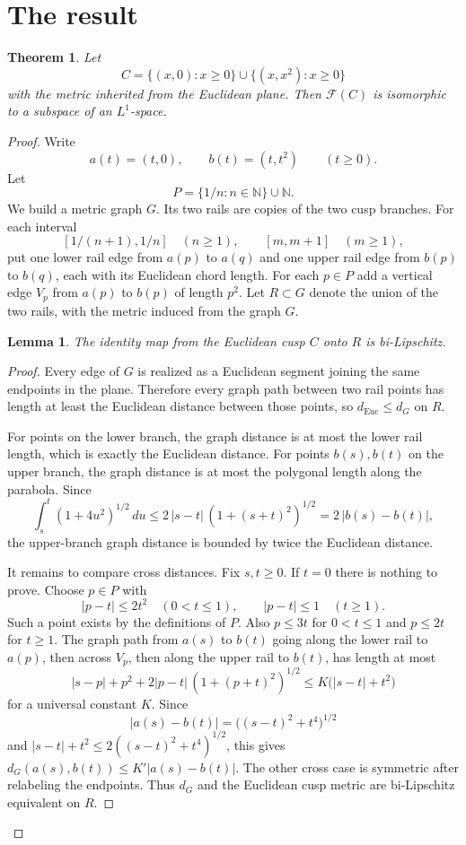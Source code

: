 \documentclass[11pt]{article}
\newtheorem{theorem}{Theorem}
\newtheorem{lemma}{Lemma}
\newcommand{\F}{\mathcal F}
\newcommand{\N}{\mathbb N}
\begin{document}
\section{The result}

\begin{theorem}
Let
\[
 C=\{(x,0):x\geq 0\}\cup \{(x,x^2):x\geq 0\}
\]
with the metric inherited from the Euclidean plane.  Then \(\F(C)\) is isomorphic to a subspace of an \(L^1\)-space.
\end{theorem}

\begin{proof}
Write
\[
 a(t)=(t,0),\qquad b(t)=(t,t^2)\qquad (t\geq 0).
\]
Let
\[
 P=\{1/n:n\in\N\}\cup \N .
\]
We build a metric graph \(G\).  Its two rails are copies of the two cusp branches.  For each interval
\[
 [1/(n+1),1/n]\quad(n\geq 1),\qquad [m,m+1]\quad(m\geq 1),
\]
put one lower rail edge from \(a(p)\) to \(a(q)\) and one upper rail edge from \(b(p)\) to \(b(q)\), each with its Euclidean chord length.  For each \(p\in P\) add a vertical edge \(V_p\) from \(a(p)\) to \(b(p)\) of length \(p^2\).  Let \(R\subset G\) denote the union of the two rails, with the metric induced from the graph \(G\).

\begin{lemma}
The identity map from the Euclidean cusp \(C\) onto \(R\) is bi-Lipschitz.
\end{lemma}

\begin{proof}
Every edge of \(G\) is realized as a Euclidean segment joining the same endpoints in the plane.  Therefore every graph path between two rail points has length at least the Euclidean distance between those points, so \(d_{\mathrm{Euc}}\leq d_G\) on \(R\).

For points on the lower branch, the graph distance is at most the lower rail length, which is exactly the Euclidean distance.  For points \(b(s),b(t)\) on the upper branch, the graph distance is at most the polygonal length along the parabola.  Since
\[
 \int_s^t (1+4u^2)^{1/2}\,du
 \leq 2\, |s-t|\,(1+(s+t)^2)^{1/2}
 =2\,|b(s)-b(t)|,
\]
the upper-branch graph distance is bounded by twice the Euclidean distance.

It remains to compare cross distances.  Fix \(s,t\geq 0\).  If \(t=0\) there is nothing to prove.  Choose \(p\in P\) with
\[
 |p-t|\leq 2t^2\quad (0<t\leq 1),\qquad |p-t|\leq 1\quad(t\geq 1).
\]
Such a point exists by the definitions of \(P\).  Also \(p\leq 3t\) for \(0<t\leq 1\) and \(p\leq 2t\) for \(t\geq 1\).  The graph path from \(a(s)\) to \(b(t)\) going along the lower rail to \(a(p)\), then across \(V_p\), then along the upper rail to \(b(t)\), has length at most
\[
 |s-p|+p^2+2|p-t|\,(1+(p+t)^2)^{1/2}
 \leq K\bigl(|s-t|+t^2\bigr)
\]
for a universal constant \(K\).  Since
\[
 |a(s)-b(t)|=\bigl((s-t)^2+t^4\bigr)^{1/2}
\]
and \(|s-t|+t^2\leq 2((s-t)^2+t^4)^{1/2}\), this gives \(d_G(a(s),b(t))\leq K' |a(s)-b(t)|\).  The other cross case is symmetric after relabeling the endpoints.  Thus \(d_G\) and the Euclidean cusp metric are bi-Lipschitz equivalent on \(R\).
\end{proof}


\end{proof}
\end{document}
